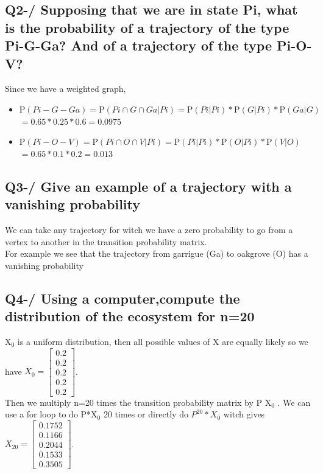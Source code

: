 \documentclass{article}
\begin{document}
    \subsection*{Q2-/ Supposing that we are in state Pi, what is the probability of a trajectory of the type Pi-G-Ga? And of a trajectory of the type Pi-O-V?}

    Since we have a weighted graph,
    \begin{itemize}
        \item $\text{P}(Pi-G-Ga) = \text{P}(Pi \cap G \cap Ga|Pi) = \text{P}(Pi|Pi)*\text{P}(G|Pi)*\text{P}(Ga|G)$
        $= 0.65*0.25*0.6 = 0.0975$
        \item $\text{P}(Pi-O-V) = \text{P}(Pi \cap O \cap V|Pi) = \text{P}(Pi|Pi)*\text{P}(O|Pi)*\text{P}(V|O)$
        $= 0.65*0.1*0.2 = 0.013$
    \end{itemize}



    \subsection*{Q3-/ Give an example of a trajectory with a vanishing probability}

    We can take any trajectory for witch we have a zero probability to go from a vertex to another in the transition probability matrix.\\[1em]
    For example we see that the trajectory from garrigue (Ga) to oakgrove (O) has a vanishing probability

    \subsection*{Q4-/ Using a computer,compute the distribution of the ecosystem for n=20}

    X\(_0\) is a uniform distribution, then all possible values of X are equally likely so we have \( X_0 = \begin{bmatrix} 0.2 \\ 0.2 \\ 0.2 \\ 0.2 \\ 0.2 \end{bmatrix} \).\\[1em]
    Then we multiply  n=20 times the transition probability matrix by P X\(_0\)  . We can use a for loop to do P*X\(_0\) 20 times or directly do \( P^{20} * X_0 \) witch gives \( X_{20} = \begin{bmatrix} 0.1752 \\ 0.1166 \\ 0.2044 \\ 0.1533 \\ 0.3505 \end{bmatrix} \).
\end{document}
